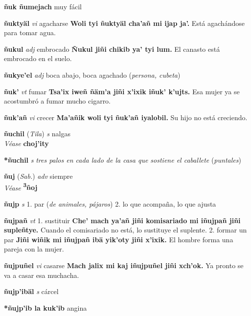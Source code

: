 \documentclass[10pt]{scrbook}
\newcommand{\entry}[1]{\textbf{#1}}
\newcommand{\onedefinition}[1]{#1.}
\newcommand{\nontranslationdef}[1]{\textit{#1}}
\newcommand{\partofspeech}[1]{\textit{#1}}
\newcommand{\spanishtranslation}[1]{#1}
\newcommand{\clarification}[1]{(\textit{#1})}
\newcommand{\cholexample}[1]{\textbf{#1}}
\newcommand{\exampletranslation}[1]{#1}
\newcommand{\alsosee}[1]{\\\textit{Véase} \textbf{#1}}
\newcommand{\relevantdialect}[1]{(\textit{#1})}
\begin{document}
\begin{multicols}{2}
\entry{ñuk ñumejach}
\spanishtranslation{muy fácil}

\entry{ñuktyäl}
\partofspeech{vi}
\spanishtranslation{agacharse}
\cholexample{Woli tyi ñuktyäl cha'añ mi ijap ja'.}
\exampletranslation{Está agachándose para tomar agua.}

\entry{ñukul}
\partofspeech{adj}
\spanishtranslation{embrocado}
\cholexample{Ñukul jiñi chikib ya' tyi lum.}
\exampletranslation{El canasto está embrocado en el suelo.}

\entry{ñukye'el}
\partofspeech{adj}
\spanishtranslation{boca abajo, boca agachado}
\clarification{persona, cubeta}

\entry{ñuk'}
\partofspeech{vt}
\spanishtranslation{fumar}
\cholexample{Tsa'ix iweñ ñäm'a jiñi x'ixik iñuk' k'ujts.}
\exampletranslation{Esa mujer ya se acostumbró a fumar mucho cigarro.}

\entry{ñuk'añ}
\partofspeech{vi}
\spanishtranslation{crecer}
\cholexample{Ma'añik woli tyi ñuk'añ iyalobil.}
\exampletranslation{Su hijo no está creciendo.}

\entry{ñuchil}
\relevantdialect{Tila}
\partofspeech{s}
\spanishtranslation{nalgas}
\alsosee{choj'ity}

\entry{*ñuchil}
\partofspeech{s}
\nontranslationdef{tres palos en cada lado de la casa que sostiene el caballete}
\clarification{puntales}

\entry{ñuj}
\relevantdialect{Sab.}
\partofspeech{adv}
\spanishtranslation{siempre}
\alsosee{\textsuperscript{3}ñoj}

\entry{ñujp}
\partofspeech{s}
\onedefinition{1}
\spanishtranslation{par}
\clarification{de animales, pájaros}
\onedefinition{2}
\spanishtranslation{lo que acompaña, lo que ajusta}

\entry{ñujpañ}
\partofspeech{vt}
\onedefinition{1}
\spanishtranslation{sustituir}
\cholexample{Che' mach ya'añ jiñi komisariado mi iñujpañ jiñi supleñtye.}
\exampletranslation{Cuando el comisariado no está, lo sustituye el suplente.}
\onedefinition{2}
\spanishtranslation{formar un par}
\cholexample{Jiñi wiñik mi iñujpañ ibä yik'oty jiñi x'ixik.}
\exampletranslation{El hombre forma una pareja con la mujer.}

\entry{ñujpuñel}
\partofspeech{vi}
\spanishtranslation{casarse}
\cholexample{Mach jalix mi kaj iñujpuñel jiñi xch'ok.}
\exampletranslation{Ya pronto se va a casar esa muchacha.}

\entry{ñujp'ibäl}
\partofspeech{s}
\spanishtranslation{cárcel}

\entry{*ñujp'ib la kuk'ib}
\spanishtranslation{angina}


\end{multicols}
\end{document}
